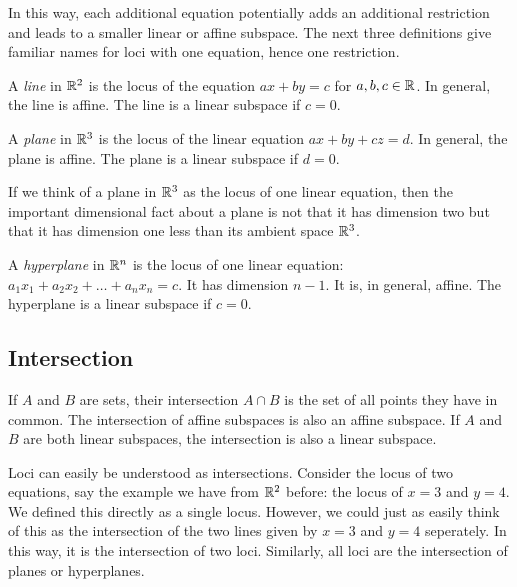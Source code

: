 \documentclass[fleqn,letterpaper]{report}
\begin{document}
In this way, each additional equation potentially adds an
additional restriction and leads to a smaller linear or affine
subspace. The next three definitions give familiar names for
loci with one equation, hence one restriction.

\begin{defn}
A \emph{line} in $\mathbb{R}^2$ is the locus of the equation $ax + by
= c$ for $a,b,c \in \mathbb{R}$. In general, the line is affine. The
line is a linear subspace if $c=0$. 
\end{defn}

\begin{defn}
A \emph{plane} in $\mathbb{R}^3$ is the locus of the linear equation
$ax + by + cz = d$. In general, the plane is affine. The
plane is a linear subspace if $d=0$. 
\end{defn}

If we think of a plane in $\mathbb{R}^3$ as the locus of one linear
equation, then the important dimensional fact about a plane is
not that it has dimension two but that it has dimension one
less than its ambient space $\mathbb{R}^3$. 

\begin{defn}
A \emph{hyperplane} in $\mathbb{R}^n$ is the locus of one linear
equation: $a_1 x_1 + a_2 x_2 + \ldots + a_n x_n = c$. It has
dimension $n-1$. It is, in general, affine. The hyperplane is
a linear subspace if $c=0$. 
\end{defn}

\subsection{Intersection}
\label{intersection}

\begin{defn}
If $A$ and $B$ are sets, their intersection $A \cap B$ is the
set of all points they have in common. The intersection of
affine subspaces is also an affine subspace. If $A$ and $B$ are
both linear subspaces, the intersection is also a linear
subspace.
\end{defn}

\begin{example}
Loci can easily be understood as intersections. Consider the 
locus of two equations, say the example we have from $\mathbb{R}^2$
before: the locus of $x=3$ and $y=4$. We defined this directly
as a single locus. However, we could just as easily think of
this as the intersection of the two lines given by $x=3$ and
$y=4$ seperately. In this way, it is the intersection of two
loci. Similarly, all loci are the intersection of planes or 
hyperplanes.
\end{example}
\end{document}

